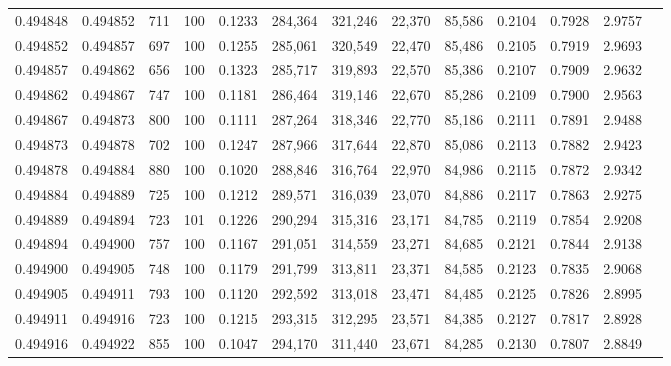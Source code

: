 \begin{tabular}{rrrrrrrrrrrrr}
0.494848 & 0.494852 &   711 & 100 &                                     0.1233 & 284,364 & 321,246 &  22,370 &  85,586 & 0.2104 & 0.7928 & 2.9757 \\
0.494852 & 0.494857 &   697 & 100 &                                     0.1255 & 285,061 & 320,549 &  22,470 &  85,486 & 0.2105 & 0.7919 & 2.9693 \\
0.494857 & 0.494862 &   656 & 100 &                                     0.1323 & 285,717 & 319,893 &  22,570 &  85,386 & 0.2107 & 0.7909 & 2.9632 \\
0.494862 & 0.494867 &   747 & 100 &                                     0.1181 & 286,464 & 319,146 &  22,670 &  85,286 & 0.2109 & 0.7900 & 2.9563 \\
0.494867 & 0.494873 &   800 & 100 &                                     0.1111 & 287,264 & 318,346 &  22,770 &  85,186 & 0.2111 & 0.7891 & 2.9488 \\
0.494873 & 0.494878 &   702 & 100 &                                     0.1247 & 287,966 & 317,644 &  22,870 &  85,086 & 0.2113 & 0.7882 & 2.9423 \\
0.494878 & 0.494884 &   880 & 100 &                                     0.1020 & 288,846 & 316,764 &  22,970 &  84,986 & 0.2115 & 0.7872 & 2.9342 \\
0.494884 & 0.494889 &   725 & 100 &                                     0.1212 & 289,571 & 316,039 &  23,070 &  84,886 & 0.2117 & 0.7863 & 2.9275 \\
0.494889 & 0.494894 &   723 & 101 &                                     0.1226 & 290,294 & 315,316 &  23,171 &  84,785 & 0.2119 & 0.7854 & 2.9208 \\
0.494894 & 0.494900 &   757 & 100 &                                     0.1167 & 291,051 & 314,559 &  23,271 &  84,685 & 0.2121 & 0.7844 & 2.9138 \\
0.494900 & 0.494905 &   748 & 100 &                                     0.1179 & 291,799 & 313,811 &  23,371 &  84,585 & 0.2123 & 0.7835 & 2.9068 \\
0.494905 & 0.494911 &   793 & 100 &                                     0.1120 & 292,592 & 313,018 &  23,471 &  84,485 & 0.2125 & 0.7826 & 2.8995 \\
0.494911 & 0.494916 &   723 & 100 &                                     0.1215 & 293,315 & 312,295 &  23,571 &  84,385 & 0.2127 & 0.7817 & 2.8928 \\
0.494916 & 0.494922 &   855 & 100 &                                     0.1047 & 294,170 & 311,440 &  23,671 &  84,285 & 0.2130 & 0.7807 & 2.8849 \\

\end{tabular}
